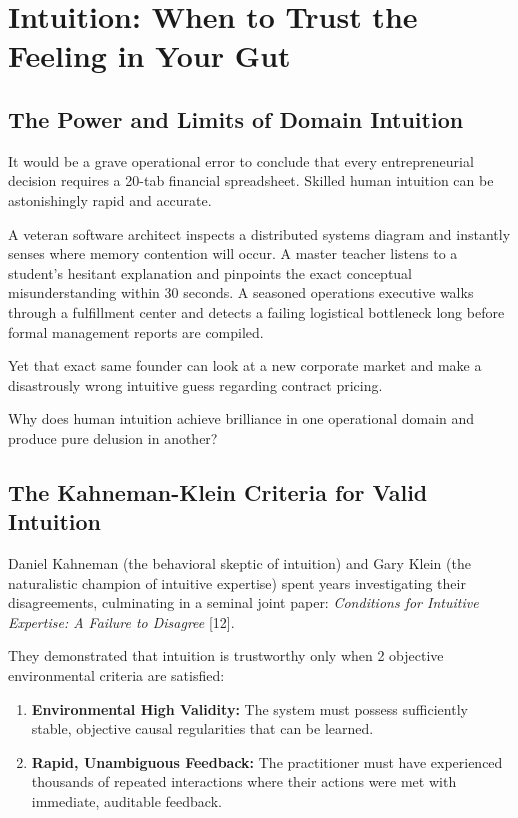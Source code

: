 \section{Intuition: When to Trust the Feeling in Your Gut}

\subsection{The Power and Limits of Domain Intuition}

It would be a grave operational error to conclude that every entrepreneurial decision requires a 20-tab financial spreadsheet. Skilled human intuition can be astonishingly rapid and accurate.

A veteran software architect inspects a distributed systems diagram and instantly senses where memory contention will occur. A master teacher listens to a student's hesitant explanation and pinpoints the exact conceptual misunderstanding within 30 seconds. A seasoned operations executive walks through a fulfillment center and detects a failing logistical bottleneck long before formal management reports are compiled.

Yet that exact same founder can look at a new corporate market and make a disastrously wrong intuitive guess regarding contract pricing.

Why does human intuition achieve brilliance in one operational domain and produce pure delusion in another?

\subsection{The Kahneman-Klein Criteria for Valid Intuition}

Daniel Kahneman (the behavioral skeptic of intuition) and Gary Klein (the naturalistic champion of intuitive expertise) spent years investigating their disagreements, culminating in a seminal joint paper: \textit{Conditions for Intuitive Expertise: A Failure to Disagree} [12].

They demonstrated that intuition is trustworthy only when 2 objective environmental criteria are satisfied:
\begin{enumerate}[leftmargin=12pt,itemsep=2pt,topsep=1pt,parsep=0pt]
  \item \textbf{Environmental High Validity:} The system must possess sufficiently stable, objective causal regularities that can be learned.
  \item \textbf{Rapid, Unambiguous Feedback:} The practitioner must have experienced thousands of repeated interactions where their actions were met with immediate, auditable feedback.
\end{enumerate}

